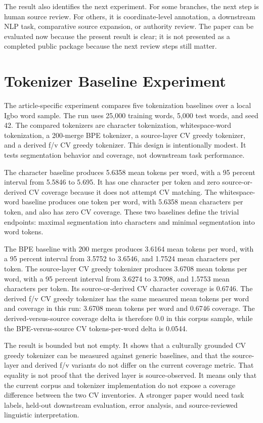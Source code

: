 \documentclass[sigconf,nonacm]{acmart}
\begin{document}
The result also identifies the next experiment. For some branches, the next step
is human source review. For others, it is coordinate-level annotation, a
downstream NLP task, comparative source expansion, or authority review. The
paper can be evaluated now because the present result is clear; it is not
presented as a completed public package because the next review steps still
matter.

\section{Tokenizer Baseline Experiment}
The article-specific experiment compares five tokenization baselines over a
local Igbo word sample. The run uses 25,000 training words, 5,000 test words,
and seed 42. The compared tokenizers are character tokenization,
whitespace-word tokenization, a 200-merge BPE tokenizer, a source-layer CV
greedy tokenizer, and a derived f/v CV greedy tokenizer. This design is
intentionally modest. It tests segmentation behavior and coverage, not
downstream task performance.

The character baseline produces 5.6358 mean tokens per word, with a 95 percent
interval from 5.5846 to 5.695. It has one character per token and zero
source-or-derived CV coverage because it does not attempt CV matching. The
whitespace-word baseline produces one token per word, with 5.6358 mean
characters per token, and also has zero CV coverage. These two baselines define
the trivial endpoints: maximal segmentation into characters and minimal
segmentation into word tokens.

The BPE baseline with 200 merges produces 3.6164 mean tokens per word, with a
95 percent interval from 3.5752 to 3.6546, and 1.7524 mean characters per token.
The source-layer CV greedy tokenizer produces 3.6708 mean tokens per word, with
a 95 percent interval from 3.6274 to 3.7098, and 1.5753 mean characters per
token. Its source-or-derived CV character coverage is 0.6746. The derived f/v
CV greedy tokenizer has the same measured mean tokens per word and coverage in
this run: 3.6708 mean tokens per word and 0.6746 coverage. The derived-versus-source
coverage delta is therefore 0.0 in this corpus sample, while the BPE-versus-source
CV tokens-per-word delta is 0.0544.

The result is bounded but not empty. It shows that a culturally grounded CV
greedy tokenizer can be measured against generic baselines, and that the
source-layer and derived f/v variants do not differ on the current coverage
metric. That equality is not proof that the derived layer is source-observed.
It means only that the current corpus and tokenizer implementation do not expose
a coverage difference between the two CV inventories. A stronger paper would
need task labels, held-out downstream evaluation, error analysis, and
source-reviewed linguistic interpretation.
\end{document}
